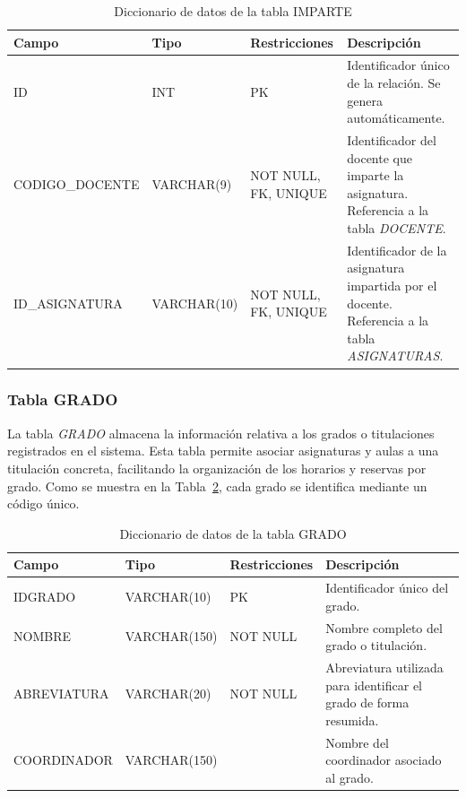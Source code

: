 \begin{table}[H]
	\centering
	\scriptsize
	\setlength{\tabcolsep}{3pt}
	\renewcommand{\arraystretch}{1.15}
	\begin{tabularx}{\textwidth}{@{}
			>{\raggedright\arraybackslash}p{2.6cm}
			>{\raggedright\arraybackslash}p{2.2cm}
			>{\raggedright\arraybackslash}p{2.2cm}
			X@{}}
		\toprule
		\textbf{Campo} & \textbf{Tipo} & \textbf{Restricciones} & \textbf{Descripción} \\
		\midrule
		ID & INT & PK & Identificador único de la relación. Se genera automáticamente. \\
		CODIGO\_\newline DOCENTE & VARCHAR(9) & NOT NULL, FK, UNIQUE & Identificador del docente que imparte la asignatura. Referencia a la tabla \textit{DOCENTE}. \\
		ID\_\newline ASIGNATURA & VARCHAR(10) & NOT NULL, FK, UNIQUE & Identificador de la asignatura impartida por el docente. Referencia a la tabla \textit{ASIGNATURAS}. \\
		\bottomrule
	\end{tabularx}
	\caption{Diccionario de datos de la tabla IMPARTE}
	\label{tab:diccionario-imparte}
\end{table}

\subsubsection{Tabla GRADO}

 La tabla \textit{GRADO} almacena la información relativa a los grados o titulaciones registrados en el sistema. Esta tabla permite asociar asignaturas y aulas a una titulación concreta, facilitando la organización de los horarios y reservas por grado. Como se muestra en la Tabla~\ref{tab:diccionario-grado}, cada grado se identifica mediante un código único.\\

\begin{table}[H]
	\centering
	\scriptsize
	\setlength{\tabcolsep}{3pt}
	\renewcommand{\arraystretch}{1.15}
	\begin{tabularx}{\textwidth}{@{}
			>{\raggedright\arraybackslash}p{2.6cm}
			>{\raggedright\arraybackslash}p{2.2cm}
			>{\raggedright\arraybackslash}p{2.2cm}
			X@{}}
		\toprule
		\textbf{Campo} & \textbf{Tipo} & \textbf{Restricciones} & \textbf{Descripción} \\
		\midrule
		IDGRADO & VARCHAR(10) & PK & Identificador único del grado. \\
		NOMBRE & VARCHAR(150) & NOT NULL & Nombre completo del grado o titulación. \\
		ABREVIATURA & VARCHAR(20) & NOT NULL & Abreviatura utilizada para identificar el grado de forma resumida. \\
		COORDINADOR & VARCHAR(150) &  & Nombre del coordinador asociado al grado. \\
		\bottomrule
	\end{tabularx}
	\caption{Diccionario de datos de la tabla GRADO}
	\label{tab:diccionario-grado}
\end{table}


